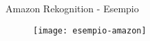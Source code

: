 %
\begin{frame}[t]{Amazon Rekognition - Esempio}
	\begin{figure}[h]
	\centering
	    \texttt{[image: esempio-amazon]}
		\label{fig:esempio-amazon}
	\end{figure}
\end{frame}
%
